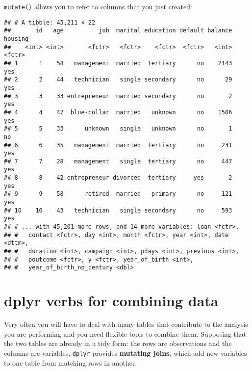 \documentclass[]{book}
\newenvironment{Shaded}{\begin{snugshade}}{\end{snugshade}}
\newcommand{\KeywordTok}[1]{\textcolor[rgb]{0.13,0.29,0.53}{\textbf{{#1}}}}
\newcommand{\DataTypeTok}[1]{\textcolor[rgb]{0.13,0.29,0.53}{{#1}}}
\newcommand{\DecValTok}[1]{\textcolor[rgb]{0.00,0.00,0.81}{{#1}}}
\newcommand{\StringTok}[1]{\textcolor[rgb]{0.31,0.60,0.02}{{#1}}}
\newcommand{\CommentTok}[1]{\textcolor[rgb]{0.56,0.35,0.01}{\textit{{#1}}}}
\newcommand{\NormalTok}[1]{{#1}}
\begin{document}
\texttt{mutate()} allows you to refer to columns that you just created:

\begin{Shaded}
\end{Shaded}

\begin{verbatim}
## # A tibble: 45,211 × 22
##       id   age          job  marital education default balance housing
##    <int> <int>       <fctr>   <fctr>    <fctr>  <fctr>   <int>  <fctr>
## 1      1    58   management  married  tertiary      no    2143     yes
## 2      2    44   technician   single secondary      no      29     yes
## 3      3    33 entrepreneur  married secondary      no       2     yes
## 4      4    47  blue-collar  married   unknown      no    1506     yes
## 5      5    33      unknown   single   unknown      no       1      no
## 6      6    35   management  married  tertiary      no     231     yes
## 7      7    28   management   single  tertiary      no     447     yes
## 8      8    42 entrepreneur divorced  tertiary     yes       2     yes
## 9      9    58      retired  married   primary      no     121     yes
## 10    10    43   technician   single secondary      no     593     yes
## # ... with 45,201 more rows, and 14 more variables: loan <fctr>,
## #   contact <fctr>, day <int>, month <fctr>, year <int>, date <dttm>,
## #   duration <int>, campaign <int>, pdays <int>, previous <int>,
## #   poutcome <fctr>, y <fctr>, year_of_birth <int>,
## #   year_of_birth_no_century <dbl>
\end{verbatim}

\section{dplyr verbs for combining
data}\label{dplyr-verbs-for-combining-data}

Very often you will have to deal with many tables that contribute to the
analysis you are performing and you need flexible tools to combine them.
Supposing that the two tables are already in a tidy form: the rows are
observations and the columns are variables, \texttt{dplyr} provides
\textbf{mutating joins}, which add new variables to one table from
matching rows in another.
\end{document}
